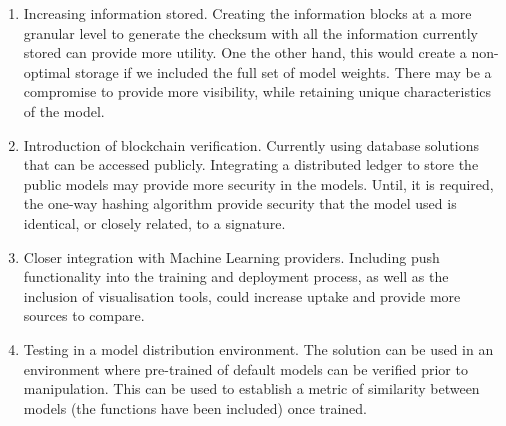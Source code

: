 \begin{enumerate}
    \item 
    Increasing information stored. 
    Creating the information blocks at a more granular level to generate the checksum with all the information currently stored can provide more utility. One the other hand, this would create a non-optimal storage if we included the full set of model weights. There may be a compromise to provide more visibility, while retaining unique characteristics of the model.
    
    \item 
    Introduction of blockchain verification.
    Currently using database solutions that can be accessed publicly. Integrating a distributed ledger to store the public models may provide more security in the models. Until, it is required, the one-way hashing algorithm provide security that the model used is identical, or closely related, to a signature.
    
    \item 
    Closer integration with Machine Learning providers.
    Including push functionality into the training and deployment process, as well as the inclusion of visualisation tools, could increase uptake and provide more sources to compare.
    
    \item 
    Testing in a model distribution environment.
    The solution can be used in an environment where pre-trained of default models can be verified prior to manipulation. This can be used to establish a metric of similarity between models (the functions have been included) once trained.
\end{enumerate}


